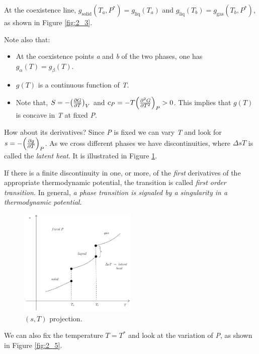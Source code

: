 \documentclass[../main/main.tex]{subfiles}
\begin{document}
At the coexistence line, \( g_{\text{solid}}(T_ a, P^*) = g_{\text{liq}}(T_a) \) and \( g_{\text{liq}}(T_b) = g_{\text{gas}}(T_b , P^*) \), as shown in Figure \ref{fig:2_3}.

Note also that:
\begin{itemize}
\item At the coexistence points \emph{a} and \emph{b} of the two phases, one has \( g_ \alpha (T) = g_ \beta (T) \).
\item \( g(T) \) is a continuous function of \emph{T}.
\item Note that, \( S= -\qty(\pdv{G}{T} )_V  \)  and \( c_P = - T \qty(\pdv[2]{G}{T})_P> 0 \). This implies that \( g(T) \) is concave in \emph{T} at fixed \emph{P}.
\end{itemize}

\noindent
How about its derivatives? Since \emph{P}  is fixed we can vary \emph{T}  and look for \( s=-\qty(\pdv{g}{T} )_P  \). As we cross different phases  we have discontinuities, where \( \Delta s T \)  is called the \emph{latent heat}. It is illustrated in Figure \ref{fig:2_4}.

If there is a finite discontinuity in one, or more, of the \emph{first} derivatives of the appropriate thermodynamic potential, the transition is called \emph{first order transition.} In general, \emph{a phase transition is signaled by a singularity in a thermodynamic potential}.


\begin{figure}[h!]
\centering
\includegraphics[width=0.5\textwidth]{../lessons/2_image/4.pdf}
\caption{\label{fig:2_4} \( (s,T) \) projection. }
\end{figure}


We can also fix the temperature \( T=T^* \)  and look at the variation of \emph{P}, as shown in Figure \ref{fig:2_5}.
\end{document}
